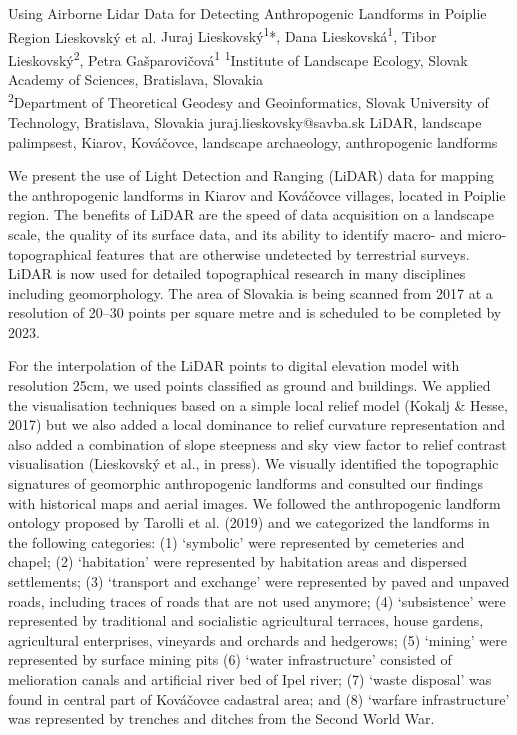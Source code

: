 


\abstract
{Using Airborne Lidar Data for Detecting Anthropogenic Landforms in Poiplie Region} %
{Lieskovský et al.} %
{Juraj Lieskovský\textsuperscript{1}*, Dana Lieskovská\textsuperscript{1}, Tibor Lieskovský\textsuperscript{2}, Petra Gašparovičová\textsuperscript{1}} %
{\KLtag} %
{\textsuperscript{1}Institute of Landscape Ecology, Slovak Academy of Sciences, Bratislava, Slovakia\\
\textsuperscript{2}Department of Theoretical Geodesy and Geoinformatics, Slovak University of Technology, Bratislava, Slovakia
} %
{juraj.lieskovsky@savba.sk}  %
{LiDAR, landscape palimpsest, Kiarov, Kováčovce, landscape archaeology, anthropogenic landforms}%
{We present the use of Light Detection and Ranging  (LiDAR) data for mapping the anthropogenic landforms in Kiarov and Kováčovce villages, located in Poiplie region. The benefits of LiDAR are the speed of data acquisition on a landscape scale, the quality of its surface data, and its ability to identify macro- and micro-topographical features that are otherwise undetected by terrestrial surveys. LiDAR is now used for detailed topographical research in many disciplines including geomorphology. The area of Slovakia is being scanned from 2017 at a resolution of 20–30 points per square metre and is scheduled to be completed by 2023. 
	
	For the interpolation of the LiDAR points to digital elevation model with resolution 25cm, we used points classified as ground and buildings. We applied the visualisation techniques based on a simple local relief model (Kokalj \& Hesse, 2017) but we also added a local dominance to relief curvature representation and also added a combination of slope steepness and sky view factor to relief contrast visualisation (Lieskovský et al., in press). We visually identified the topographic signatures of geomorphic anthropogenic landforms and consulted our findings with historical maps and aerial images. We followed the anthropogenic landform ontology proposed by Tarolli et al. (2019) and we categorized the landforms in the following categories: (1) ‘symbolic’ were represented by cemeteries and chapel; (2) ‘habitation’ were represented by habitation areas and dispersed settlements; (3) ‘transport and exchange’ were represented by paved and unpaved roads, including traces of roads that are not used anymore; (4) ‘subsistence’ were represented by traditional and socialistic agricultural terraces, house gardens, agricultural enterprises, vineyards and orchards and  hedgerows; (5) ‘mining’ were represented by surface mining pits (6) ‘water infrastructure’ consisted of melioration canals and artificial river bed of Ipel river; (7) ‘waste disposal’ was found in central part of Kováčovce cadastral area; and (8) ‘warfare infrastructure’ was represented by trenches and ditches from the Second World War.
}%
